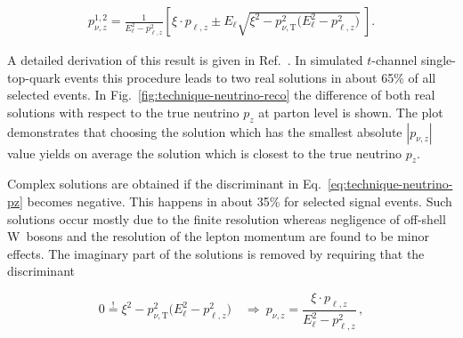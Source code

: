 \begin{align}
p_{\nu,z}^{1,2}=\frac{1}{E_{\ell}^{2}-p_{\ell,z}^{2}}\left[\xi\cdot p_{\ell,z}\pm E_{\ell} \sqrt{\xi^2-p_{\nu,\mathrm{T}}^2\big(E_{\ell}^2-p_{\ell,z}^2\big)}~\right]. \label{eq:technique-neutrino-pz}
\end{align}

A detailed derivation of this result is given in Ref.~\cite{Chwalek:1416031}. In simulated $t$-channel single-top-quark events this procedure leads to two real solutions in about 65\% of all selected events. In Fig.~\ref{fig:technique-neutrino-reco} the difference of both real solutions with respect to the true neutrino $p_{z}$ at parton level is shown. The plot demonstrates that choosing the solution which has the smallest absolute $|p_{\nu,z}|$ value yields on average the solution which is closest to the true neutrino $p_{z}$.


Complex solutions are obtained if the discriminant in Eq.~\ref{eq:technique-neutrino-pz} becomes negative. This happens in about 35\% for selected signal events. Such solutions occur mostly due to the finite \met resolution whereas negligence of off-shell W~bosons and the resolution of the lepton momentum are found to be minor effects. The imaginary part of the solutions is removed by requiring that the discriminant 

\begin{equation}
0\overset{!}{=}\xi^2-p_{\nu,\mathrm{T}}^2\big(E_{\ell}^2-p_{\ell,z}^2\big)\quad
\Rightarrow~ p_{\nu,z}=\frac{\xi\cdot p_{\ell,z}}{E_{\ell}^{2}-p_{\ell,z}^{2}}\,,\label{eq:technique-pz-complex}
\end{equation}

